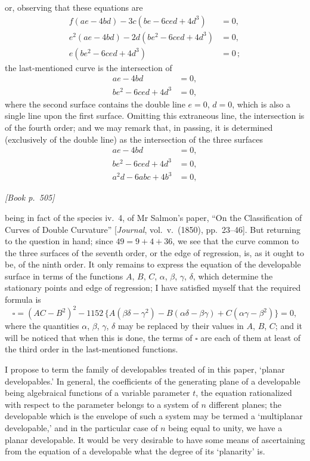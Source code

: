 \documentclass[11pt]{article}
\begin{document}
or, observing that these equations are
\[
\begin{aligned}
f (a e - 4 b d) - 3 c (b e - 6 c e d + 4 d^{3}) &= 0,\\
e^{2}(a e - 4 b d) - 2 d (b e^{2} - 6 c e d + 4 d^{3}) &= 0,\\
e (b e^{2} - 6 c e d + 4 d^{3}) &= 0\,;
\end{aligned}
\]
the last-mentioned curve is the intersection of
\[
\begin{aligned}
a e - 4 b d &= 0,\\
b e^{2} - 6 c e d + 4 d^{3} &= 0,
\end{aligned}
\]
where the second surface contains the double line $e=0$, $d=0$, which is also a single line upon the first surface. Omitting this extraneous line, the intersection is of the fourth order; and we may remark that, in passing, it is determined (exclusively of the double line) as the intersection of the three surfaces
\[
\begin{aligned}
a e - 4 b d &= 0,\\
b e^{2} - 6 c e d + 4 d^{3} &= 0,\\
a^{2} d - 6 a b c + 4 b^{3} &= 0,
\end{aligned}
\]

\medskip
\noindent\textit{[Book p.~505]}\hfill

\smallskip

\noindent being in fact of the species iv.~4, of Mr Salmon's paper, ``On the Classification of Curves of Double Curvature'' [\emph{Journal}, vol.~v.\ (1850), pp.~23--46]. But returning to the question in hand; since $49 = 9 + 4 + 36$, we see that the curve common to the three surfaces of the seventh order, or the edge of regression, is, as it ought to be, of the ninth order. It only remains to express the equation of the developable surface in terms of the functions $A$, $B$, $C$, $\alpha$, $\beta$, $\gamma$, $\delta$, which determine the stationary points and edge of regression; I have satisfied myself that the required formula is
\[
\square = (AC - B^{2})^{2} - 1152\,\{A(\beta\delta - \gamma^{2}) - B(\alpha\delta - \beta\gamma) + C(\alpha\gamma - \beta^{2})\} = 0,
\]
where the quantities $\alpha$, $\beta$, $\gamma$, $\delta$ may be replaced by their values in $A$, $B$, $C$; and it will be noticed that when this is done, the terms of $\square$ are each of them at least of the third order in the last-mentioned functions.

I propose to term the family of developables treated of in this paper, `planar developables.' In general, the coefficients of the generating plane of a developable being algebraical functions of a variable parameter $t$, the equation rationalized with respect to the parameter belongs to a system of $n$ different planes; the developable which is the envelope of such a system may be termed a `multiplanar developable,' and in the particular case of $n$ being equal to unity, we have a planar developable. It would be very desirable to have some means of ascertaining from the equation of a developable what the degree of its `planarity' is.
\end{document}
